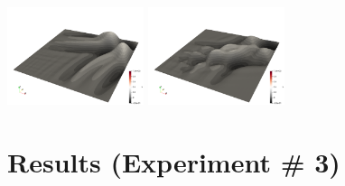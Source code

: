 \begin{center}
\includegraphics[width=4cm]{python_codes/fieldstone_165/results2/uuu0250.png}
\includegraphics[width=4cm]{python_codes/fieldstone_165/results2/uuu0299.png}
\end{center}


\section*{Results (Experiment \# 3)}

